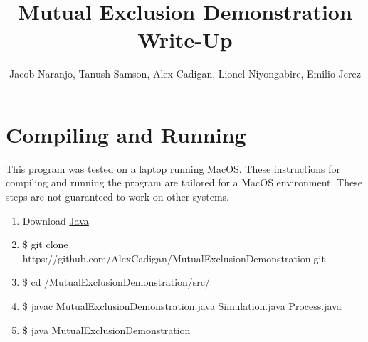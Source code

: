 \documentclass [11pt] {article}
\title {Mutual Exclusion Demonstration Write-Up}
\author {Jacob Naranjo, Tanush Samson, Alex Cadigan, Lionel Niyongabire, Emilio Jerez}
\begin{document}
	\maketitle
	\section {Compiling and Running}
	This program was tested on a laptop running MacOS.  These instructions for compiling and running the program are tailored for a MacOS environment.  These steps are not guaranteed to work on other systems.
	\begin {enumerate}
		\item Download \href {http://www.oracle.com/technetwork/java/javase/downloads/index.html} {Java}
  		\item \$ git clone https://github.com/AlexCadigan/MutualExclusionDemonstration.git
		\item \$ cd /MutualExclusionDemonstration/src/
		\item \$ javac MutualExclusionDemonstration.java Simulation.java Process.java
		\item \$ java MutualExclusionDemonstration
	\end {enumerate}
\end{document}
